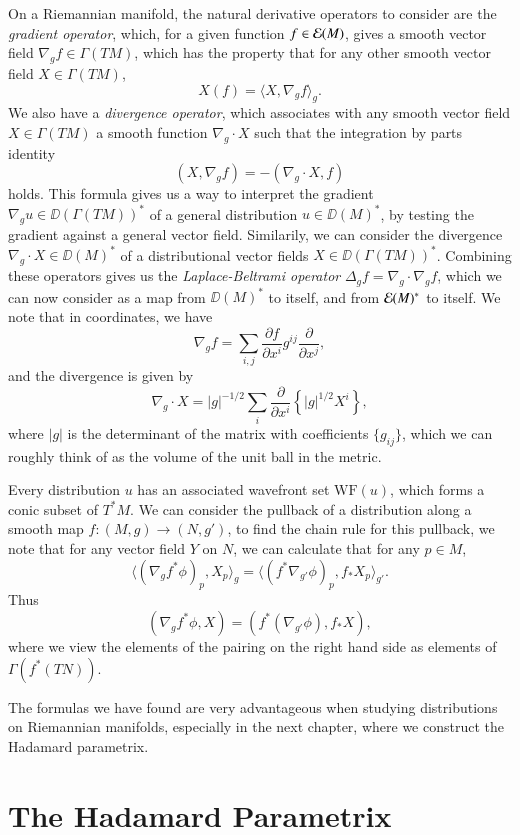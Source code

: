 On a Riemannian manifold, the natural derivative operators to consider are the \emph{gradient operator}, which, for a given function $f \in \operatorname{\mathcal{E}}(M)$, gives a smooth vector field $\nabla_g f \in \Gamma(TM)$, which has the property that for any other smooth vector field $X \in \Gamma(TM)$,
%
\[ X(f) = \langle X, \nabla_g f \rangle_g. \]
%
We also have a \emph{divergence operator}, which associates with any smooth vector field $X \in \Gamma(TM)$ a smooth function $\nabla_g \cdot X$ such that the integration by parts identity
%
\[ (X, \nabla_g f) = - ( \nabla_g \cdot X, f ) \]
%
holds. This formula gives us a way to interpret the gradient $\nabla_g u \in \DD(\Gamma(TM))^*$ of a general distribution $u \in \DD(M)^*$, by testing the gradient against a general vector field. Similarily, we can consider the divergence $\nabla_g \cdot X \in \DD(M)^*$ of a distributional vector fields $X \in \DD(\Gamma(TM))^*$. Combining these operators gives us the \emph{Laplace-Beltrami operator} $\Delta_g f = \nabla_g \cdot \nabla_g f$, which we can now consider as a map from $\DD(M)^*$ to itself, and from $\operatorname{\mathcal{E}}(M)^*$ to itself. We note that in coordinates, we have
%
\[ \nabla_g f = \sum_{i,j} \frac{\partial f}{\partial x^i} g^{ij} \frac{\partial}{\partial x^j}, \]
%
and the divergence is given by
%
\[ \nabla_g \cdot X = |g|^{-1/2} \sum_i \frac{\partial}{\partial x^i} \left\{ |g|^{1/2} X^i \right\}, \]
%
where $|g|$ is the determinant of the matrix with coefficients $\{ g_{ij} \}$, which we can roughly think of as the volume of the unit ball in the metric.


Every distribution $u$ has an associated wavefront set $\text{WF}(u)$, which forms a conic subset of $T^*M$. We can consider the pullback of a distribution along a smooth map $f: (M,g) \to (N,g')$, to find the chain rule for this pullback, we note that for any vector field $Y$ on $N$, we can calculate that for any $p \in M$,
%
\[ \langle (\nabla_g f^* \phi)_p, X_p \rangle_g = \langle (f^*\nabla_{g'} \phi)_p, f_* X_p \rangle_{g'}. \]
%
Thus
%
\[ (\nabla_g f^* \phi, X) = ( f^* (\nabla_{g'} \phi), f_* X ), \]
%
where we view the elements of the pairing on the right hand side as elements of $\Gamma(f^* (TN))$.

The formulas we have found are very advantageous when studying distributions on Riemannian manifolds, especially in the next chapter, where we construct the Hadamard parametrix.








\chapter{The Hadamard Parametrix}


